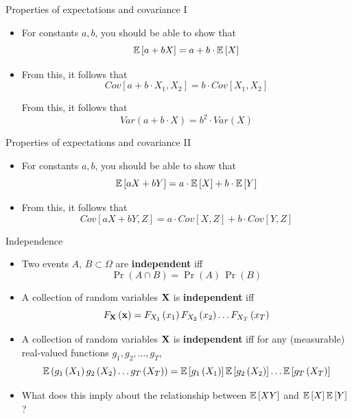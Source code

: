 \begin{frame}{Properties of expectations and covariance I}
\begin{itemize}
	\item For constants $a,b$, you should be able to show that\[
		\mathbb{E}\left[ a + b X\right] = a + b \cdot \mathbb{E}\left[ X\right] 
	\]

	\medskip
	\item From this, it follows that\[
		Cov\left[ a + b \cdot X_1 , X_2 \right] = b \cdot Cov\left[X_1 , X_2 \right] 
	\]

	\medskip From this, it follows that\[
			Var\left(a + b \cdot X\right) = b^2 \cdot Var\left( X\right) 
	\]
\end{itemize}
\end{frame}


\begin{frame}{Properties of expectations and covariance II}
\begin{itemize}
	\item For constants $a,b$, you should be able to show that\[
		\mathbb{E}\left[ a X + b Y\right] = a  \cdot \mathbb{E}\left[ X\right] + b \cdot \mathbb{E}\left[ Y\right] 
	\]

	\medskip
	\item From this, it follows that\[
		Cov\left[ a X + b Y, Z \right] = a \cdot Cov\left[X , Z\right] + b \cdot Cov\left[Y , Z\right] 
	\]
\end{itemize}
\end{frame}



\begin{frame}{Independence}
\begin{itemize}
	\item Two events $A$, $B \subset \Omega$  are {\bf independent} iff\[
		\Pr\left(A\cap B\right) = \Pr\left( A\right)\, \Pr\left( B\right)
	\]
	
	\medskip
	\item A collection of random variables ${\bf X}$ is {\bf independent} iff\[
		F_{{\bf X}} \left({\bf x}\right) = F_{X_1}\left(x_1\right) F_{X_2}\left(x_2\right) \dots F_{X_T}\left(x_T\right) 
	\]
	
		\medskip
	\item A collection of random variables ${\bf X}$ is {\bf independent} iff for any (measurable) real-valued functions $g_1,g_2,\dots,g_T$, \[
		\mathbb{E} \left(g_1\left(X_1\right)g_2\left(X_2\right)\dots g_T\left(X_T\right)\right) = \mathbb{E}\left[g_1\left(X_1\right)\right] \mathbb{E}\left[g_2\left(X_2\right)\right] \dots \mathbb{E}\left[g_T\left(X_T\right)\right]
	\]
	
	
	\medskip
	\item What does this imply about the relationship between $\mathbb{E}\left[X Y\right]$ and $\mathbb{E}\left[X\right] \mathbb{E}\left[Y\right]$? 
			
\end{itemize}
\end{frame}


